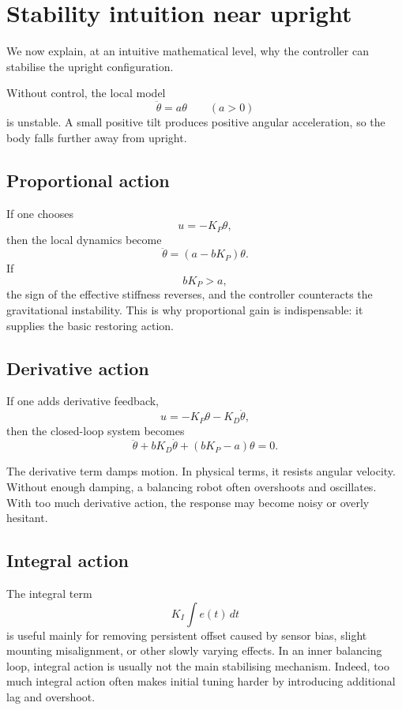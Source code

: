 \documentclass[11pt,a4paper]{article}
\begin{document}
\section{Stability intuition near upright}

We now explain, at an intuitive mathematical level, why the controller can stabilise the upright configuration.

Without control, the local model
\[
\ddot{\theta} = a\theta
\qquad (a>0)
\]
is unstable. A small positive tilt produces positive angular acceleration, so the body falls further away from upright.

\subsection*{Proportional action}

If one chooses
\[
u = -K_P \theta,
\]
then the local dynamics become
\[
\ddot{\theta} = (a - bK_P)\theta.
\]
If
\[
bK_P > a,
\]
the sign of the effective stiffness reverses, and the controller counteracts the gravitational instability. This is why proportional gain is indispensable: it supplies the basic restoring action.

\subsection*{Derivative action}

If one adds derivative feedback,
\[
u = -K_P \theta - K_D \dot{\theta},
\]
then the closed-loop system becomes
\[
\ddot{\theta} + bK_D \dot{\theta} + (bK_P-a)\theta = 0.
\]

The derivative term damps motion. In physical terms, it resists angular velocity. Without enough damping, a balancing robot often overshoots and oscillates. With too much derivative action, the response may become noisy or overly hesitant.

\subsection*{Integral action}

The integral term
\[
K_I \int e(t)\,dt
\]
is useful mainly for removing persistent offset caused by sensor bias, slight mounting misalignment, or other slowly varying effects. In an inner balancing loop, integral action is usually not the main stabilising mechanism. Indeed, too much integral action often makes initial tuning harder by introducing additional lag and overshoot.
\end{document}
